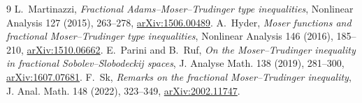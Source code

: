 \documentclass[11pt]{article}
\begin{document}
\begin{thebibliography}{9}
 L.~Martinazzi, \emph{Fractional Adams--Moser--Trudinger
type inequalities}, Nonlinear Analysis 127 (2015), 263--278,
\href{https://arxiv.org/abs/1506.00489}{arXiv:1506.00489}.
 A.~Hyder, \emph{Moser functions and fractional
Moser--Trudinger type inequalities}, Nonlinear Analysis 146 (2016), 185--210,
\href{https://arxiv.org/abs/1510.06662}{arXiv:1510.06662}.
 E.~Parini and B.~Ruf, \emph{On the Moser--Trudinger
inequality in fractional Sobolev--Slobodeckij spaces}, J. Analyse Math. 138
(2019), 281--300, \href{https://arxiv.org/abs/1607.07681}{arXiv:1607.07681}.
 F.~Sk, \emph{Remarks on the fractional Moser--Trudinger
inequality}, J. Anal. Math. 148 (2022), 323--349,
\href{https://arxiv.org/abs/2002.11747}{arXiv:2002.11747}.
\end{thebibliography}
\end{document}
